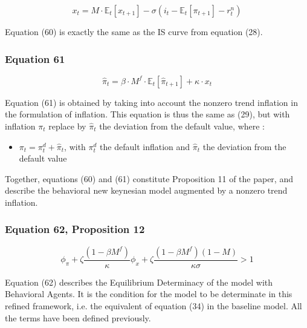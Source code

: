 \documentclass{article}
\begin{document}
\begin{equation}\tag{60}
    x_{t}=M\cdot\mathbb{E}_{t}\left[x_{t+1}\right]-\sigma\left(i_{t}-\mathbb{E}_{t}\left[\pi_{t+1}\right]-r^{n}_{t}\right)
\end{equation}

Equation (60) is exactly the same as the IS curve from equation (28).

\subsubsection*{Equation 61}

\begin{equation}\tag{61}
    \hat{\pi}_{t}=\beta\cdot M^{f}\cdot\mathbb{E}_t\left[\hat{\pi}_{t+1}\right]+\kappa\cdot x_{t}
\end{equation}

Equation (61) is obtained by taking into account the nonzero trend inflation in the formulation of inflation. 
This equation is thus the same as (29), but with inflation $\pi_{t}$ replace by $\hat{\pi}_{t}$ the deviation from the default value, where : 
\begin{itemize}
    \item $\pi_{t}=\pi^{d}_{t}+\hat{\pi}_{t}$, with $\pi^{d}_{t}$ the default inflation and $\hat{\pi}_{t}$ the deviation from the default value
\end{itemize}

Together, equations (60) and (61) constitute Proposition 11 of the paper, and describe the behavioral new keynesian model augmented by a nonzero trend inflation.

\subsubsection*{Equation 62, Proposition 12}

\begin{equation}\tag{62}
    \phi_{\pi}+\zeta \frac{(1-\beta M^{f})}{\kappa}\phi_{x}+\zeta\frac{(1-\beta M^{f})(1-M)}{\kappa \sigma}>1
\end{equation}

Equation (62) describes the Equilibrium Determinacy of the model with Behavioral Agents.
It is the condition for the model to be determinate in this refined framework, i.e. the equivalent of equation (34) in the baseline model.
All the terms have been defined previously. 
\end{document}
